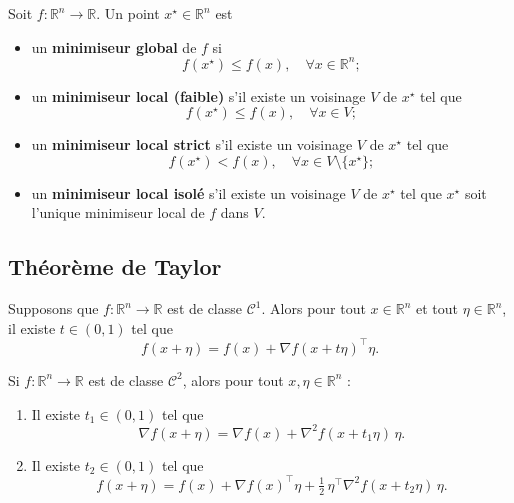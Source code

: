 \begin{definition}
Soit $f : \mathbb{R}^n \to \mathbb{R}$. Un point $x^\star \in \mathbb{R}^n$ est
\begin{itemize}
    \item un \textbf{minimiseur global} de $f$ si
    \[
        f(x^\star) \leq f(x), \quad \forall x \in \mathbb{R}^n ;
    \]
    \item un \textbf{minimiseur local (faible)} s’il existe un voisinage $V$ de $x^\star$
    tel que
    \[
        f(x^\star) \leq f(x), \quad \forall x \in V ;
    \]
    \item un \textbf{minimiseur local strict} s’il existe un voisinage $V$ de $x^\star$
    tel que
    \[
        f(x^\star) < f(x), \quad \forall x \in V \setminus \{x^\star\} ;
    \]
    \item un \textbf{minimiseur local isolé} s’il existe un voisinage $V$ de $x^\star$
    tel que $x^\star$ soit l’unique minimiseur local de $f$ dans $V$.
\end{itemize}
\end{definition}

\subsection{Théorème de Taylor}
\label{subsec:2.2.1}

\begin{theoreme}
\label{thm:MVT}
Supposons que $f : \mathbb{R}^n \to \mathbb{R}$ est de classe $\mathcal{C}^1$.
Alors pour tout $x \in \mathbb{R}^n$ et tout $\eta \in \mathbb{R}^n$, il existe
$t \in (0,1)$ tel que
\begin{equation}
    f(x+\eta) = f(x) + \nabla f(x+t\eta)^\top \eta.
\end{equation}
\end{theoreme}



\begin{theoreme}
\label{thm:Taylor}
Si $f : \mathbb{R}^n \to \mathbb{R}$ est de classe $\mathcal{C}^2$, alors pour tout
$x,\eta \in \mathbb{R}^n$ :
\begin{enumerate}
    \item Il existe $t_1 \in (0,1)$ tel que
    \[
        \nabla f(x + \eta) = \nabla f(x) + \nabla^2 f(x + t_1\eta)\,\eta.
    \]
    \item Il existe $t_2 \in (0,1)$ tel que
    \[
        f(x + \eta) = f(x) + \nabla f(x)^\top \eta + \tfrac{1}{2}\,\eta^\top \nabla^2 f(x + t_2\eta)\,\eta.
    \]
\end{enumerate}
\end{theoreme}


